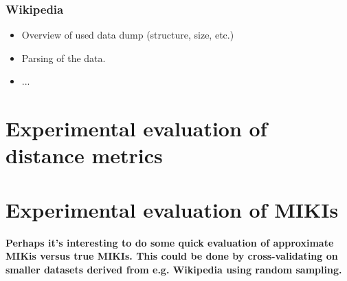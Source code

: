 

\subsubsection{Wikipedia}
\label{subsec:wikipedia}
	
\begin{itemize}
	\item Overview of used data dump (structure, size, etc.)
	\item Parsing of the data.
	\item ...
\end{itemize}




\section{Experimental evaluation of distance metrics}
\label{sec:distance_evaluation}




\section{Experimental evaluation of MIKIs}
\label{sec:miki_evaluation}

\textbf{Perhaps it's interesting to do some quick evaluation of approximate MIKis versus true MIKIs. This could be done by cross-validating on smaller datasets derived from e.g. Wikipedia using random sampling.}

